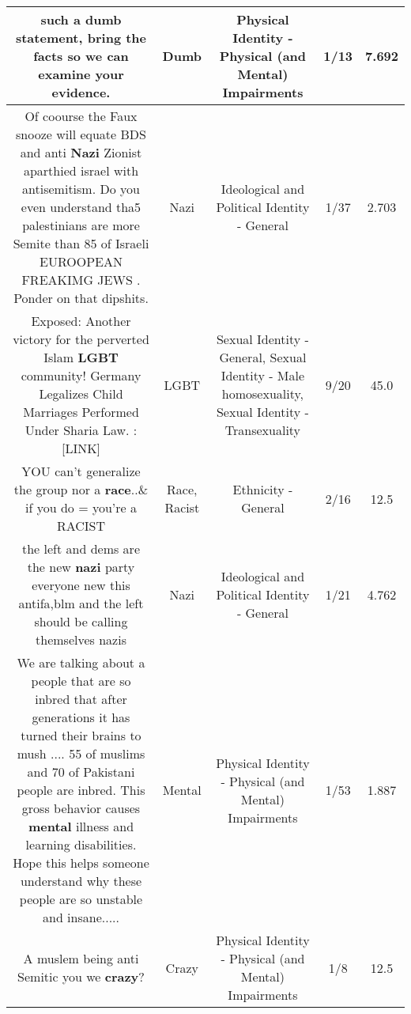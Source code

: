 \documentclass[11pt]{article}
\newlength\mylength
\begin{document}
\begin{center}
\begin{longtable}{|C{.65\mylength}|C{.30\mylength}|C{.12\mylength}|C{.12\mylength}|C{.12\mylength}|}
  \small such a \textbf{dumb} statement,  bring the facts so we can examine your evidence.\normalsize   & Dumb & Physical Identity - Physical (and Mental) Impairments & 1/13 & 7.692 \\  \hline
  \small Of coourse the Faux snooze will equate BDS and anti \textbf{Nazi} Zionist aparthied israel with antisemitism. Do you even understand tha5 palestinians are more Semite than 85 of Israeli EUROOPEAN FREAKIMG JEWS . Ponder on that dipshits.\normalsize   & Nazi &  Ideological and Political Identity - General & 1/37 & 2.703 \\  \hline
  \small Exposed: Another victory for the perverted Islam  \textbf{L\textbf{G\textbf{BT}}} community! Germany Legalizes Child Marriages Performed Under Sharia Law. : [LINK] \normalsize   & LGBT & Sexual Identity - General, Sexual Identity - Male homosexuality, Sexual Identity - Transexuality & 9/20 & 45.0 \\  \hline
  \small YOU can't generalize the group nor a \textbf{race}..\& if you do = you're a RACIST\normalsize   & Race, Racist & Ethnicity - General & 2/16 & 12.5 \\  \hline
  \small the left and dems are the new \textbf{nazi} party everyone new this antifa,blm and the left should be calling themselves nazis\normalsize   & Nazi &  Ideological and Political Identity - General & 1/21 & 4.762 \\  \hline
  \small We are talking about a people that are so inbred that after generations it has turned their brains to mush .... 55 of muslims and 70 of Pakistani people are inbred. This gross behavior causes \textbf{mental} illness and learning disabilities. Hope this helps someone understand why these people are so unstable and insane.....\normalsize   & Mental & Physical Identity - Physical (and Mental) Impairments & 1/53 & 1.887 \\  \hline
  \small A muslem being anti Semitic  you we \textbf{crazy}?\normalsize   & Crazy & Physical Identity - Physical (and Mental) Impairments & 1/8 & 12.5 \\  \hline

\end{longtable}
\end{center}
\end{document}
